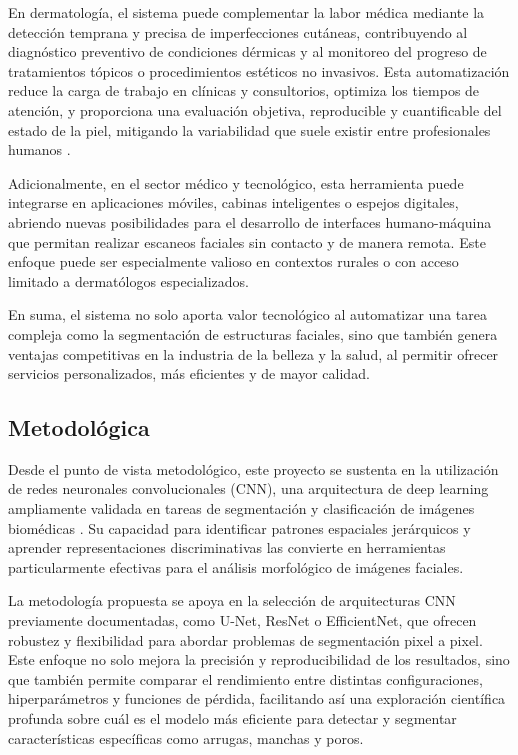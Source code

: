 En dermatología, el sistema puede complementar la labor médica mediante la detección temprana y precisa de imperfecciones cutáneas, contribuyendo al diagnóstico preventivo de condiciones dérmicas y al monitoreo del progreso de tratamientos tópicos o procedimientos estéticos no invasivos. Esta automatización reduce la carga de trabajo en clínicas y consultorios, optimiza los tiempos de atención, y proporciona una evaluación objetiva, reproducible y cuantificable del estado de la piel, mitigando la variabilidad que suele existir entre profesionales humanos \parencite{huang2020}.

Adicionalmente, en el sector médico y tecnológico, esta herramienta puede integrarse en aplicaciones móviles, cabinas inteligentes o espejos digitales, abriendo nuevas posibilidades para el desarrollo de interfaces humano-máquina que permitan realizar escaneos faciales sin contacto y de manera remota. Este enfoque puede ser especialmente valioso en contextos rurales o con acceso limitado a dermatólogos especializados.

En suma, el sistema no solo aporta valor tecnológico al automatizar una tarea compleja como la segmentación de estructuras faciales, sino que también genera ventajas competitivas en la industria de la belleza y la salud, al permitir ofrecer servicios personalizados, más eficientes y de mayor calidad.

\subsection{Metodológica}

Desde el punto de vista metodológico, este proyecto se sustenta en la utilización de redes neuronales convolucionales (CNN), una arquitectura de deep learning ampliamente validada en tareas de segmentación y clasificación de imágenes biomédicas \parencite{ronneberger2015}. Su capacidad para identificar patrones espaciales jerárquicos y aprender representaciones discriminativas las convierte en herramientas particularmente efectivas para el análisis morfológico de imágenes faciales.

La metodología propuesta se apoya en la selección de arquitecturas CNN previamente documentadas, como U-Net, ResNet o EfficientNet, que ofrecen robustez y flexibilidad para abordar problemas de segmentación pixel a pixel. Este enfoque no solo mejora la precisión y reproducibilidad de los resultados, sino que también permite comparar el rendimiento entre distintas configuraciones, hiperparámetros y funciones de pérdida, facilitando así una exploración científica profunda sobre cuál es el modelo más eficiente para detectar y segmentar características específicas como arrugas, manchas y poros.

